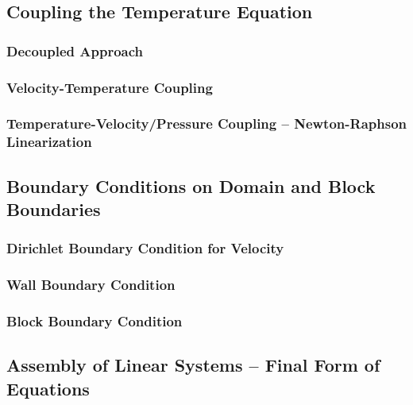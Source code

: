    \subsection{Coupling the Temperature Equation}
      
      \subsubsection{Decoupled Approach}
      \subsubsection{Velocity-Temperature Coupling}
      \subsubsection{Temperature-Velocity/Pressure Coupling -- Newton-Raphson Linearization}

    \subsection{Boundary Conditions on Domain and Block Boundaries}

      \subsubsection{Dirichlet Boundary Condition for Velocity}


      \subsubsection{Wall Boundary Condition}

      \subsubsection{Block Boundary Condition}

    \subsection{Assembly of Linear Systems -- Final Form of Equations}


